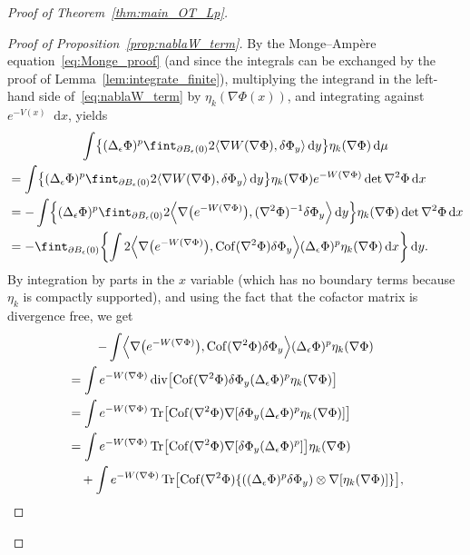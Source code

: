 \documentclass[AHL,Unicode,longabstracts]{cedram}
\DeclareMathOperator{\Tr}{Tr}
\DeclareMathOperator{\Cof}{Cof}
\DeclareMathOperator{\Div}{div}
\newcommand{\V}{V}
\newcommand{\W}{W}
\newcommand{\source}{\mu}
\newcommand*\diff{\mathop{}\!\mathrm{d}}
\newcommand{\OT}{\Phi}
\newcommand{\avgint}{\fint}
\newcommand{\findiff}{\delta\OT}
\let\originalleft\left
\let\originalright\right
\renewcommand{\left}{\mathopen{}\mathclose\bgroup\originalleft}
\renewcommand{\right}{\aftergroup\egroup\originalright}
\begin{document}
\begin{proof}[Proof of Theorem~\ref{thm:main_OT_Lp}]
\begin{proof}[Proof of Proposition~\ref{prop:nablaW_term}]
By the Monge--Ampère equation~\eqref{eq:Monge_proof} (and since the integrals can be exchanged by the proof of Lemma~\ref{lem:integrate_finite}), multiplying the integrand in the left-hand side of~\eqref{eq:nablaW_term} by $\eta_k(\nabla\OT(x))$, and integrating against $e^{-\V(x)}\diff x$, yields
\begin{multline*}
\int\left\{ (\Delta_{\epsilon}\OT)^p\avgint_{\partial B_{\epsilon}(0)}2\langle \nabla\W(\nabla \OT),\findiff_y\rangle\diff y\right\}\eta_k(\nabla\OT)\diff \source\\
\begin{aligned}
&=\int\left\{ (\Delta_{\epsilon}\OT)^p\avgint_{\partial B_{\epsilon}(0)}2\langle \nabla\W(\nabla \OT),\findiff_y\rangle\diff y\right\}\eta_k(\nabla\OT)e^{-\W(\nabla\OT)}\det\nabla^2\OT\diff x\\
&=-\int\left\{ (\Delta_{\epsilon}\OT)^p\avgint_{\partial B_{\epsilon}(0)}2\left\langle \nabla\bigl(e^{-\W(\nabla\OT)}\bigr),(\nabla^2\OT)^{-1}\findiff_y\right\rangle\diff y\right\}\eta_k(\nabla\OT)\det\nabla^2\OT\diff x\\
&=-\avgint_{\partial B_{\epsilon}(0)}\left\{\int 2\left\langle \nabla\bigl(e^{-\W(\nabla\OT)}\bigr),\Cof(\nabla^2\OT)\findiff_y\right\rangle(\Delta_{\epsilon}\OT)^p\eta_k(\nabla\OT)\diff x\right\}\diff y.
\end{aligned}
\end{multline*}
By integration by parts in the $x$ variable (which has no boundary terms because $\eta_k$ is compactly supported), and using the fact that the cofactor matrix is divergence free, we get
\begin{multline*}
-\int \left\langle \nabla\bigl(e^{-\W(\nabla\OT)}\bigr),\Cof(\nabla^2\OT)\findiff_y\right\rangle(\Delta_{\epsilon}\OT)^p\eta_k(\nabla\OT)
\\
\begin{aligned}
&=\int e^{-\W(\nabla\OT)} \Div\left[\Cof(\nabla^2\OT)\findiff_y(\Delta_{\epsilon}\OT)^p\eta_k(\nabla\OT)\right]
\\
&=\int e^{-\W(\nabla\OT)} \Tr\left[\Cof(\nabla^2\OT)\nabla[\findiff_y(\Delta_{\epsilon}\OT)^p\eta_k(\nabla\OT)]\right]
\\
&=\int e^{-\W(\nabla\OT)} \Tr\left[\Cof(\nabla^2\OT)\nabla[\findiff_y(\Delta_{\epsilon}\OT)^p]\right]\eta_k(\nabla\OT)
\\
&\quad +\int e^{-\W(\nabla\OT)} \Tr\left[\Cof(\nabla^2\OT)\left\{\left((\Delta_{\epsilon}\OT)^p\findiff_y\right)\otimes\nabla[\eta_k(\nabla\OT)]\right\}\right],
\end{aligned}

\end{multline*}
\end{proof}
\end{proof}
\end{document}
